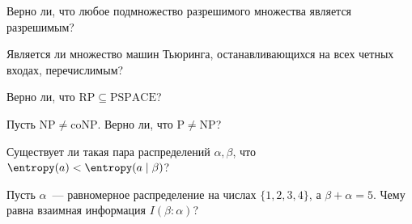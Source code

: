 \item Верно ли, что любое подмножество разрешимого множества является разрешимым?

\item Является ли множество машин Тьюринга, останавливающихся на всех четных входах, перечислимым?

\item Верно ли, что $\mathrm{RP} \subseteq \mathrm{PSPACE}$?

\item Пусть $\mathrm{NP} \neq \mathrm{coNP}$. Верно ли, что $\mathrm{P} \neq \mathrm{NP}$?

\item Существует ли такая пара распределений $\alpha, \beta$, что $\entropy(a) < \entropy(a \mid \beta)$?

\item Пусть $\alpha$~--- равномерное распределение на числах $\{1, 2, 3, 4\}$, а $\beta + \alpha = 5$. Чему
    равна взаимная информация $I(\beta : \alpha)$?
